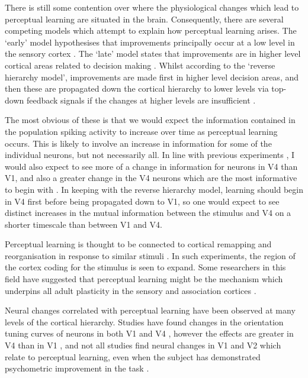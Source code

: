 There is still some contention over where the physiological changes which lead to perceptual learning are situated in the brain.
Consequently, there are several competing models which attempt to explain how perceptual learning arises.
The `early' model hypothesises that improvements principally occur at a low level in the sensory cortex \citep{Gilbert2001,Fahle2005}.
The `late' model states that improvements are in higher level cortical areas related to decision making \citep{Yu2004}.
Whilst according to the `reverse hierarchy model', improvements are made first in higher level decision areas, and then these are propagated down the cortical hierarchy to lower levels via top-down feedback signals if the changes at higher levels are insufficient \citep{Ahissar2004,Hochstein2002}.

The most obvious of these is that we would expect the information contained in the population spiking activity to increase over time as perceptual learning occurs.
This is likely to involve an increase in information for some of the individual neurons, but not necessarily all.
In line with previous experiments \citep{Raiguel2006}, I would also expect to see more of a change in information for neurons in \ac{V4} than \ac{V1}, and also a greater change in the \ac{V4} neurons which are the most informative to begin with \citep{Raiguel2006}.
In keeping with the reverse hierarchy model, learning should begin in \ac{V4} first before being propagated down to \ac{V1}, so one would expect to see distinct increases in the mutual information between the stimulus and \ac{V4} on a shorter timescale than between \ac{V1} and \ac{V4}.

Perceptual learning is thought to be connected to cortical remapping and reorganisation in response to similar stimuli \citep{Dinse2003,Pleger2003,Polley2006}.
In such experiments, the region of the cortex coding for the stimulus is seen to expand.
Some researchers in this field have suggested that perceptual learning might be the mechanism which underpins all adult plasticity in the sensory and association cortices \citep{Gilbert2001}.


Neural changes correlated with perceptual learning have been observed at many levels of the cortical hierarchy.
Studies have found changes in the orientation tuning curves of neurons in both \ac{V1} \citep{Schoups2001} and \ac{V4} \citep{Li2004,Yang2004,Raiguel2006}, however the effects are greater in \ac{V4} than in \ac{V1} \citep{Raiguel2006}, and not all studies find neural changes in \ac{V1} and \ac{V2} which relate to perceptual learning, even when the subject has demonstrated psychometric improvement in the task \citep{Ghose2002}.

